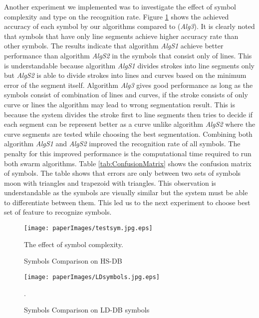 Another experiment we implemented was to investigate the effect of symbol complexity and type on the recognition rate. Figure \ref{fig:test2} shows the achieved accuracy of each symbol by our algorithms compared to \cite{earlyprocess} (\textsl{Alg3}). It is clearly noted that symbols that have only line segments achieve higher accuracy rate than other symbols.  The results indicate that algorithm \textsl{AlgS1} achieve better performance than algorithm \textsl{AlgS2} in the symbols that consist only of lines. This is understandable because algorithm \textsl{AlgS1} divides strokes into line segments only but \textsl{AlgS2} is able to divide strokes into lines and curves based on the minimum error of the segment itself. Algorithm \textsl{Alg3} gives good performance as long as the symbols consist of combination of lines and curves, if the stroke consists of only curve or lines the algorithm may lead to wrong segmentation result. This is because the system divides the stroke first to line segments then tries to decide if each segment can be represent better as a curve unlike algorithm \textsl{AlgS2} where the curve segments are tested while choosing the best segmentation. Combining both algorithm \textsl{AlgS1} and \textsl{AlgS2} improved the recognition rate of all symbols. The penalty for this improved performance is the computational time required to run both swarm algorithms. Table \ref{tab:ConfusionMatrix} shows the confusion matrix of symbols. The table shows that errors are only between two sets of symbols moon with triangles and trapezoid with triangles. This observation is understandable as the symbols are visually similar but the system must be able to differentiate between them. This led us to the next experiment to choose best set of feature to recognize symbols. 
 
 \begin{figure}
	\centering
		\texttt{[image: paperImages/testsym.jpg.eps]}
	\caption{Symbols Comparison on HS-DB} The effect of symbol complexity.  %
	\label{fig:test2}
\end{figure}  

\begin{figure}
	\centering
		\texttt{[image: paperImages/LDsymbols.jpg.eps]}
	\caption{Symbols Comparison on LD-DB symbols}.  %
	\label{fig:LDtest2}
\end{figure}  


